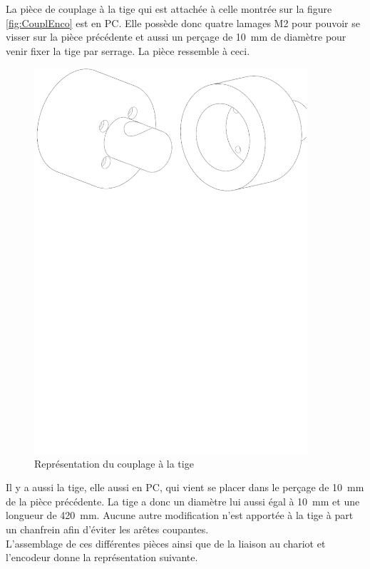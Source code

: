 La pièce de couplage à la tige qui est attachée à celle montrée sur la figure \ref{fig:CouplEnco} est en \acrshort{PC}. Elle possède donc quatre
lamages M2 pour pouvoir se visser sur la pièce précédente et aussi un perçage de 10~mm de diamètre pour venir fixer la tige par serrage.
La pièce ressemble à ceci.

\begin{figure}[H]
  \centering
  \includegraphics[width = 0.9\textwidth]{assets/figures/CouplageTige.svg}
  \caption{Représentation du couplage à la tige}
  \label{fig:CouplTige}
\end{figure}

Il y a aussi la tige, elle aussi en \acrshort{PC}, qui vient se placer dans le perçage de 10~mm de la pièce précédente. La tige a donc un
diamètre lui aussi égal à 10~mm et une longueur de 420~mm. Aucune autre modification n'est apportée à la tige à part un chanfrein afin d'éviter
les arêtes coupantes.\\

L'assemblage de ces différentes pièces ainsi que de la liaison au chariot et l'encodeur donne la représentation suivante.

